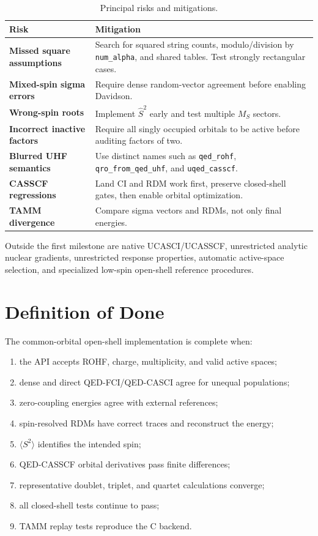 \documentclass[11pt]{article}
\newcommand{\code}[1]{\texttt{\small #1}}
\begin{document}
\begin{table}[htbp]
\centering
\caption{Principal risks and mitigations.}
\begin{tabularx}{\textwidth}{>{\bfseries}p{} X}
\toprule Risk & Mitigation \\
\midrule
Missed square assumptions & Search for squared string counts, modulo/division
by \code{num\_alpha}, and shared tables. Test strongly rectangular cases. \\
Mixed-spin sigma errors & Require dense random-vector agreement before enabling
Davidson. \\
Wrong-spin roots & Implement \(\hat S^2\) early and test multiple \(M_S\)
sectors. \\
Incorrect inactive factors & Require all singly occupied orbitals to be active
before auditing factors of two. \\
Blurred UHF semantics & Use distinct names such as \code{qed\_rohf},
\code{qro\_from\_qed\_uhf}, and \code{uqed\_casscf}. \\
CASSCF regressions & Land CI and RDM work first, preserve closed-shell gates,
then enable orbital optimization. \\
TAMM divergence & Compare sigma vectors and RDMs, not only final energies. \\
\bottomrule
\end{tabularx}
\end{table}

Outside the first milestone are native UCASCI/UCASSCF, unrestricted analytic
nuclear gradients, unrestricted response properties, automatic active-space
selection, and specialized low-spin open-shell reference procedures.

\section{Definition of Done}

The common-orbital open-shell implementation is complete when:
\begin{enumerate}
  \item the API accepts ROHF, charge, multiplicity, and valid active spaces;
  \item dense and direct QED-FCI/QED-CASCI agree for unequal populations;
  \item zero-coupling energies agree with external references;
  \item spin-resolved RDMs have correct traces and reconstruct the energy;
  \item \(\langle S^2\rangle\) identifies the intended spin;
  \item QED-CASSCF orbital derivatives pass finite differences;
  \item representative doublet, triplet, and quartet calculations converge;
  \item all closed-shell tests continue to pass;
  \item TAMM replay tests reproduce the C backend.
\end{enumerate}
\end{document}
